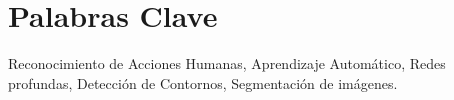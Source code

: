 \chapter*{Palabras Clave}

Reconocimiento de Acciones Humanas, Aprendizaje Automático, Redes profundas, Detección de Contornos, Segmentación de imágenes.
